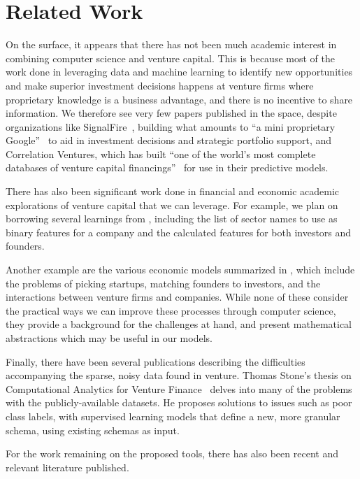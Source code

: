 \section{Related Work}

On the surface, it appears that there has not been much academic interest in combining computer science and venture capital. This is because most of the work done in leveraging data and machine learning to identify new opportunities and make superior investment decisions happens at venture firms where proprietary knowledge is a business advantage, and there is no incentive to share information. We therefore see very few papers published in the space, despite organizations like SignalFire~\cite{signalfire}, building what amounts to ``a  mini proprietary Google''~\cite{techrunch-signalfire} to aid in investment decisions and strategic portfolio support, and Correlation Ventures, which has built ``one of the world’s most complete databases of venture capital financings''~\cite{correlation-about} for use in their predictive models.

There has also been significant work done in financial and economic academic explorations of venture capital that we can leverage. For example, we plan on borrowing several learnings from \cite{2017arXiv170604229H}, including the list of sector names to use as binary features for a company and the calculated features for both investors and founders.

Another example are the various economic models summarized in \cite{venture-survey}, which include the problems of picking startups, matching founders to investors, and the interactions between venture firms and companies. While none of these consider the practical ways we can improve these processes through computer science, they provide a background for the challenges at hand, and present mathematical abstractions which may be useful in our models.

Finally, there have been several publications describing the difficulties accompanying the sparse, noisy data found in venture. Thomas Stone's thesis on Computational Analytics for Venture Finance~\cite{stone2014computational} delves into many of the problems with the publicly-available datasets. He proposes solutions to issues such as poor class labels, with supervised learning models that define a new, more granular schema, using existing schemas as input.

For the work remaining on the proposed tools, there has also been recent and relevant literature published.

